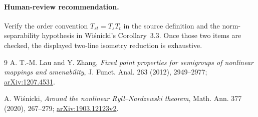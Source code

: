 \documentclass[11pt]{article}
\begin{document}
\paragraph{Human-review recommendation.}
Verify the order convention \(T_{st}=T_sT_t\) in the source definition and
the norm-separability hypothesis in Wiśnicki's Corollary~3.3.  Once those two
items are checked, the displayed two-line isometry reduction is exhaustive.

\begin{thebibliography}{9}
A. T.-M. Lau and Y. Zhang,
\emph{Fixed point properties for semigroups of nonlinear mappings and
amenability}, J. Funct. Anal. 263 (2012), 2949--2977;
\href{https://arxiv.org/abs/1207.4531}{arXiv:1207.4531}.

A. Wiśnicki,
\emph{Around the nonlinear Ryll--Nardzewski theorem}, Math. Ann. 377
(2020), 267--279;
\href{https://arxiv.org/abs/1903.12123}{arXiv:1903.12123v2}.
\end{thebibliography}
\end{document}
